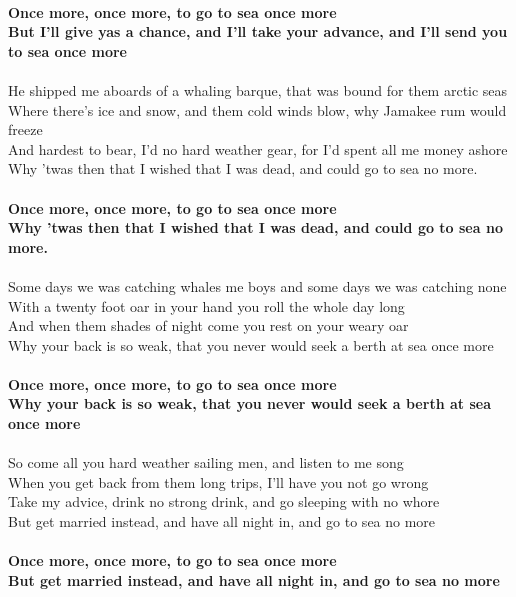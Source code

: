 \documentclass[letterpaper,9pt]{article}
\begin{document}
\\\textbf{Once more, once more, to go to sea once more
\\But I'll give yas a chance, and I'll take your advance, and I'll send you to sea once more}
\\
\\He shipped me aboards of a whaling barque, that was bound for them arctic seas
\\Where there's ice and snow, and them cold winds blow, why Jamakee rum would freeze
\\And hardest to bear, I'd no hard weather gear, for I'd spent all me money ashore
\\Why 'twas then that I wished that I was dead, and could go to sea no more.
\\
\\\textbf{Once more, once more, to go to sea once more
\\Why 'twas then that I wished that I was dead, and could go to sea no more.}
\\
\\Some days we was catching whales me boys and some days we was catching none
\\With a twenty foot oar in your hand you roll the whole day long
\\And when them shades of night come you rest on your weary oar
\\Why your back is so weak, that you never would seek a berth at sea once more
\\
\\\textbf{Once more, once more, to go to sea once more
\\Why your back is so weak, that you never would seek a berth at sea once more}
\\
\\So come all you hard weather sailing men, and listen to me song
\\When you get back from them long trips, I'll have you not go wrong
\\Take my advice, drink no strong drink, and go sleeping with no whore
\\But get married instead, and have all night in, and go to sea no more
\\
\\\textbf{Once more, once more, to go to sea once more
\\But get married instead, and have all night in, and go to sea no more}


\newpage
\end{document}

